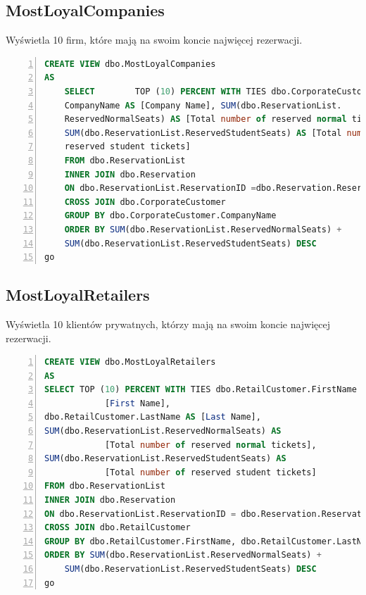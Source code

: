\documentclass[]{article}
\begin{document}
	\subsection{MostLoyalCompanies}
	Wyświetla 10 firm, które mają na swoim koncie najwięcej rezerwacji.
	\begin{lstlisting}[language=SQL,
						showspaces=false,
						basicstyle=\ttfamily,
						numbers=left,
						numberstyle=\tiny,
						backgroundcolor=\color{lightg},
						keywordstyle=\color{lightblue},
						commentstyle=\color{gray}]
CREATE VIEW dbo.MostLoyalCompanies
AS
	SELECT        TOP (10) PERCENT WITH TIES dbo.CorporateCustomer.
	CompanyName AS [Company Name], SUM(dbo.ReservationList.
	ReservedNormalSeats) AS [Total number of reserved normal tickets], 
	SUM(dbo.ReservationList.ReservedStudentSeats) AS [Total number of
	reserved student tickets]
	FROM dbo.ReservationList
	INNER JOIN dbo.Reservation
	ON dbo.ReservationList.ReservationID =dbo.Reservation.ReservationID
	CROSS JOIN dbo.CorporateCustomer
	GROUP BY dbo.CorporateCustomer.CompanyName
	ORDER BY SUM(dbo.ReservationList.ReservedNormalSeats) +
	SUM(dbo.ReservationList.ReservedStudentSeats) DESC
go
	\end{lstlisting}

	\subsection{MostLoyalRetailers}
	Wyświetla 10 klientów prywatnych, którzy mają na swoim koncie najwięcej rezerwacji.
	\begin{lstlisting}[language=SQL,
						showspaces=false,
						basicstyle=\ttfamily,
						numbers=left,
						numberstyle=\tiny,
						backgroundcolor=\color{lightg},
						keywordstyle=\color{lightblue},
						commentstyle=\color{gray}]
CREATE VIEW dbo.MostLoyalRetailers
AS
SELECT TOP (10) PERCENT WITH TIES dbo.RetailCustomer.FirstName AS
			[First Name],
dbo.RetailCustomer.LastName AS [Last Name],
SUM(dbo.ReservationList.ReservedNormalSeats) AS
			[Total number of reserved normal tickets], 
SUM(dbo.ReservationList.ReservedStudentSeats) AS
			[Total number of reserved student tickets]
FROM dbo.ReservationList
INNER JOIN dbo.Reservation
ON dbo.ReservationList.ReservationID = dbo.Reservation.ReservationID
CROSS JOIN dbo.RetailCustomer
GROUP BY dbo.RetailCustomer.FirstName, dbo.RetailCustomer.LastName
ORDER BY SUM(dbo.ReservationList.ReservedNormalSeats) +
	SUM(dbo.ReservationList.ReservedStudentSeats) DESC
go
	\end{lstlisting}
\end{document}

